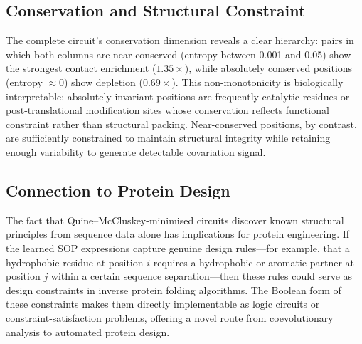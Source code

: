 \subsection{Conservation and Structural Constraint}
The complete circuit's conservation dimension reveals a clear hierarchy:
pairs in which both columns are near-conserved (entropy between 0.001 and
0.05) show the strongest contact enrichment ($1.35\times$), while absolutely
conserved positions (entropy $\approx 0$) show depletion ($0.69\times$).
This non-monotonicity is biologically interpretable: absolutely invariant
positions are frequently catalytic residues or post-translational modification
sites whose conservation reflects functional constraint rather than structural
packing.  Near-conserved positions, by contrast, are sufficiently constrained
to maintain structural integrity while retaining enough variability to
generate detectable covariation signal.

\subsection{Connection to Protein Design}
The fact that Quine--McCluskey-minimised circuits discover known structural
principles from sequence data alone has implications for protein engineering.
If the learned SOP expressions capture genuine design rules---for example,
that a hydrophobic residue at position $i$ requires a hydrophobic or aromatic
partner at position $j$ within a certain sequence separation---then these
rules could serve as design constraints in inverse protein folding algorithms.
The Boolean form of these constraints makes them directly implementable as
logic circuits or constraint-satisfaction problems, offering a novel route
from coevolutionary analysis to automated protein design.
